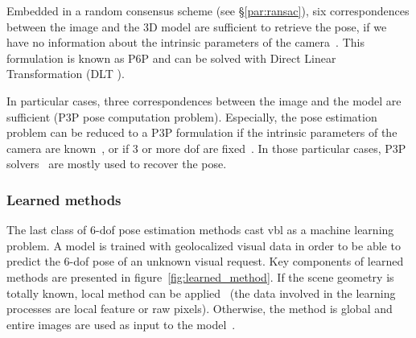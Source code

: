 Embedded in a random consensus scheme (see \S\ref{par:ransac}), six correspondences between the image and the 3D model are sufficient to retrieve the pose, if we have no information about the intrinsic parameters of the camera~\citep{Donoser2014,Li2010,Li2010,Heisterklaus2014}. This formulation is known as P6P and can be solved with Direct Linear Transformation (DLT \citep{Hartley2003}).

In particular cases, three correspondences between the image and the model are sufficient (P3P pose computation problem). Especially, the pose estimation problem can be reduced to a P3P formulation if the intrinsic parameters of the camera are known~\citep{Irschara2009,Middelberg2014}, or if 3 or more \ac{dof} are fixed~\citep{Zeisl2015,Qu2016,Svarm2016,Svarm2014}. In those particular cases, P3P solvers~\citet{Kneip2011} are mostly used to recover the pose.

\subsubsection{Learned methods}


\label{subsubsec:pose_regression}
The last class of 6-\ac{dof} pose estimation methods cast \ac{vbl} as a machine learning problem. A model is trained with geolocalized visual data in order to be able to predict the 6-\ac{dof} pose of an unknown visual request. Key components of learned methods are presented in figure~\ref{fig:learned_method}. If the scene geometry is totally known, local method can be applied~\citep{Shotton2013} (\ie the data involved in the learning processes are local feature or raw pixels). Otherwise, the method is global and entire images are used as input to the model~\citep{Kendall2015}.

